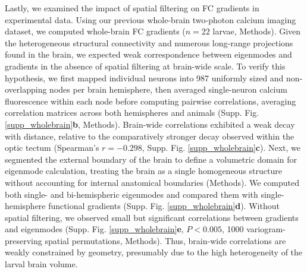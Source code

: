 \documentclass{article}
\begin{document}
Lastly, we examined the impact of spatial filtering on FC gradients in experimental data. Using our previous whole-brain two-photon calcium imaging dataset\cite{legare2025structural}, we computed whole-brain FC gradients ($n=22$ larvae, Methods). Given the heterogeneous structural connectivity and numerous long-range projections found in the brain, we expected weak correspondence between eigenmodes and gradients in the absence of spatial filtering at brain-wide scale. To verify this hypothesis, we first mapped individual neurons into 987 uniformly sized and non-overlapping nodes per brain hemisphere, then averaged single-neuron calcium fluorescence within each node before computing pairwise correlations, averaging correlation matrices across both hemispheres and animals (Supp. Fig. \ref{supp_wholebrain}\textbf{b}, Methods). Brain-wide correlations exhibited a weak decay with distance, relative to the comparatively stronger decay observed within the optic tectum (Spearman's $r=-0.298$, Supp. Fig. \ref{supp_wholebrain}\textbf{c}). Next, we segmented the external boundary of the brain to define a volumetric domain for eigenmode calculation, treating the brain as a single homogeneous structure without accounting for internal anatomical boundaries (Methods). We computed both single- and bi-hemispheric eigenmodes and compared them with single-hemisphere functional gradients (Supp. Fig. \ref{supp_wholebrain}\textbf{d}). Without spatial filtering, we observed small but significant correlations between gradients and eigenmodes (Supp. Fig. \ref{supp_wholebrain}\textbf{e}, $P<0.005$, 1000 variogram-preserving spatial permutations, Methods). Thus, brain-wide correlations are weakly constrained by geometry, presumably due to the high heterogeneity of the larval brain volume.
\end{document}
